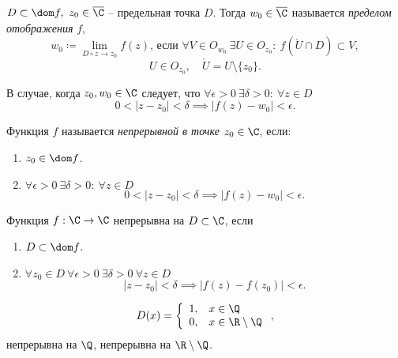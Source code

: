 \begin{definition}
	$ D \subset \dom f, \ z_0 \in \overline{\C} $ -- предельная точка $ D $. Тогда $ w_0 \in \overline{\C} $ называется \emph{пределом отображения} $ f $,
	\[
		w_0 \coloneqq \underset{D \circ z \rightarrow z_0}{\lim}f(z) \text{, если }\forall V \in O_{w_0} \ \exists U \in O_{z_0}: \ f(\mathring{U}\cap D)\subset V,
	\]
	\[
		U \in O_{z_0}, \quad \mathring{U} = U\setminus\{z_0\}.
	\]
\end{definition}

\begin{note}
	В случае, когда $ z_0,w_0 \in\C $ следует, что $ \forall \epsilon > 0 \ \exists \delta > 0 : \ \forall z \in D $
	\[
		0 < | z - z_0 | < \delta \implies \big| f(z) - w_0 \big| < \epsilon.
	\]
\end{note}

\begin{definition}
	Функция $ f $ называется \emph{непрерывной в точке} $ z_0 \in \C $, если:
	\begin{enumerate}
		\item $ z_0 \in \dom f $.
		\item $ \forall \epsilon > 0 \ \exists \delta > 0: \ \forall z \in D $
		      \[
			      0 < | z - z_0 | < \delta \implies \big| f(z) - w_0 \big| < \epsilon.
		      \]
	\end{enumerate}
\end{definition}

\begin{definition}
	Функция $ f : \C \rightarrow \C $ непрерывна на $ D \subset \C $, если
	\begin{enumerate}
		\item $ D \subset \dom f $.
		\item $ \forall z_0 \in D \ \forall \epsilon > 0 \ \exists \delta > 0 \ \forall z \in D $
		      \[
			      | z - z_0 | < \delta \implies \big|f(z) - f(z_0)\big| < \epsilon.
		      \]
	\end{enumerate}
\end{definition}

\begin{note}
	\[
		D(x) = \left\{\begin{array}{ll}
			1, & x \in \Q              \\
			0, & x \in \R \setminus \Q
		\end{array}\right.,
	\]
	непрерывна на $ \Q $, непрерывна на $ \R \setminus \Q $.
\end{note}

